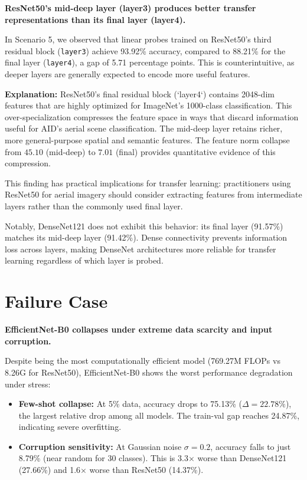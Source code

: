 \documentclass[11pt, a4paper]{article}
\begin{document}
\textbf{ResNet50's mid-deep layer (layer3) produces better transfer representations than its final layer (layer4).}

In Scenario 5, we observed that linear probes trained on ResNet50's third residual block (\texttt{layer3}) achieve 93.92\% accuracy, compared to 88.21\% for the final layer (\texttt{layer4}), a gap of 5.71 percentage points. This is counterintuitive, as deeper layers are generally expected to encode more useful features.

\textbf{Explanation:} ResNet50's final residual block (`layer4`) contains 2048-dim features that are highly optimized for ImageNet's 1000-class classification. This over-specialization compresses the feature space in ways that discard information useful for AID's aerial scene classification. The mid-deep layer retains richer, more general-purpose spatial and semantic features. The feature norm collapse from $45.10$ (mid-deep) to $7.01$ (final) provides quantitative evidence of this compression.

This finding has practical implications for transfer learning: practitioners using ResNet50 for aerial imagery should consider extracting features from intermediate layers rather than the commonly used final layer.

Notably, DenseNet121 does not exhibit this behavior: its final layer (91.57\%) matches its mid-deep layer (91.42\%). Dense connectivity prevents information loss across layers, making DenseNet architectures more reliable for transfer learning regardless of which layer is probed.

\section{Failure Case}

\textbf{EfficientNet-B0 collapses under extreme data scarcity and input corruption.}

Despite being the most computationally efficient model (769.27M FLOPs vs 8.26G for ResNet50), EfficientNet-B0 shows the worst performance degradation under stress:

\begin{itemize}[nosep]
    \item \textbf{Few-shot collapse:} At 5\% data, accuracy drops to 75.13\% ($\Delta = 22.78\%$), the largest relative drop among all models. The train-val gap reaches 24.87\%, indicating severe overfitting.
    \item \textbf{Corruption sensitivity:} At Gaussian noise $\sigma=0.2$, accuracy falls to just 8.79\% (near random for 30 classes). This is 3.3$\times$ worse than DenseNet121 (27.66\%) and 1.6$\times$ worse than ResNet50 (14.37\%).
\end{itemize}
\end{document}

